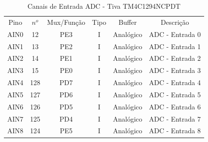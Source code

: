 \begin{table}[H]
	\centering
	\caption{Canais de Entrada ADC - Tiva TM4C1294NCPDT \cite{DATASHEET_TIVA} }
	\label{tab:CanaisADC}
	\begin{tabular}{|c|c|c|c|c|c|}
		\rowcolor[HTML]{000000} 
		{\color[HTML]{FFFFFF} Pino} & {\color[HTML]{FFFFFF} $n^{o}$} & {\color[HTML]{FFFFFF} Mux/Função} & {\color[HTML]{FFFFFF} Tipo} & {\color[HTML]{FFFFFF} Buffer} & {\color[HTML]{FFFFFF} Descrição}            \\
		AIN0                        & 12                             & PE3                               & I                           & Analógico                     & ADC - Entrada 0                             \\
		\hline
		AIN1                        & 13                             & PE2                               & I                           & Analógico                     & ADC - Entrada 1                             \\
		\hline
		AIN2                        & 14                             & PE1                               & I                           & Analógico                     & ADC - Entrada 2                             \\
		\hline
		AIN3                        & 15                             & PE0                               & I                           & Analógico                     & ADC - Entrada 3                             \\
		\hline
		AIN4                        & 128                            & PD7                               & I                           & Analógico                     & ADC - Entrada 4                             \\
		\hline
		AIN5                        & 127                            & PD6                               & I                           & Analógico                     & ADC - Entrada 5                             \\
		\hline
		AIN6                        & 126                            & PD5                               & I                           & Analógico                     & ADC - Entrada 6                             \\
		\hline
		AIN7                        & 125                            & PD4                               & I                           & Analógico                     & ADC - Entrada 7                             \\
		\hline
		AIN8                        & 124                            & PE5                               & I                           & Analógico                     & ADC - Entrada 8                             \\

\end{tabular}
\end{table}
